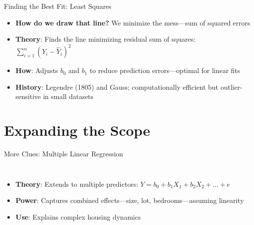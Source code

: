 \documentclass{beamer}
\begin{document}
	\begin{frame}{Finding the Best Fit: Least Squares}
			\begin{itemize}
				 \item \textbf{How do we draw that line?} We minimize the mess—sum of squared errors
				\item \textbf{Theory}: Finds the line minimizing residual sum of squares: $\sum_{i=1}^n (Y_i - \hat{Y}_i)^2$
				\item \textbf{How}: Adjusts $b_0$ and $b_1$ to reduce prediction errors—optimal for linear fits
				\item \textbf{History}: Legendre (1805) and Gauss; computationally efficient but outlier-sensitive in small datasets
			\end{itemize}
		\end{frame}
	
	\section{Expanding the Scope}
	
	\begin{frame}[fragile]{More Clues: Multiple Linear Regression}
		\begin{columns}
			\begin{itemize}
				\item \textbf{Theory}: Extends to multiple predictors: $Y = b_0 + b_1X_1 + b_2X_2 + \dots + e$
				\item \textbf{Power}: Captures combined effects—size, lot, bedrooms—assuming linearity
				\item \textbf{Use}: Explains complex housing dynamics
			\end{itemize}
		\end{columns}
	\end{frame}
	

\end{document}
